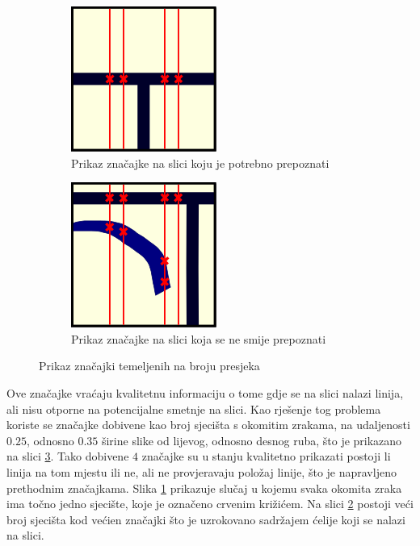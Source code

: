 \documentclass[times, utf8, zavrsni, numeric]{fer}
\begin{document}
\begin{figure}[th!]
    \centering
    \begin{subfigure}{.5\textwidth}
        \centering
        \includegraphics[width=.45\linewidth]{Images/Feature_true_2.png}
        \captionsetup{justification=centering}
        \caption{Prikaz značajke na slici koju je potrebno prepoznati}
        \label{fig:featureDemo2a}
    \end{subfigure}%
    \begin{subfigure}{.5\textwidth}
        \centering
        \includegraphics[width=.45\linewidth]{Images/Feature_false_2.png}
        \caption{Prikaz značajke na slici koja se ne smije prepoznati}
        \label{fig:featureDemo2b}
    \end{subfigure}
    \caption{Prikaz značajki temeljenih na broju presjeka}
    \label{fig:featureDemo2}
\end{figure}

Ove značajke vraćaju kvalitetnu informaciju o tome gdje se na slici nalazi linija, ali nisu otporne na potencijalne smetnje na slici.
Kao rješenje tog problema koriste se značajke dobivene kao broj sjecišta s okomitim zrakama, na udaljenosti $0.25$, odnosno $0.35$ širine slike od lijevog, odnosno desnog ruba, što je prikazano na slici \ref{fig:featureDemo2}.
Tako dobivene $4$ značajke su u stanju kvalitetno prikazati postoji li linija na tom mjestu ili ne, ali ne provjeravaju položaj linije, što je napravljeno prethodnim značajkama.
Slika \ref{fig:featureDemo2a} prikazuje slučaj u kojemu svaka okomita zraka ima točno jedno sjecište, koje je označeno crvenim križićem.
Na slici \ref{fig:featureDemo2b} postoji veći broj sjecišta kod većien značajki što je uzrokovano sadržajem ćelije koji se nalazi na slici.\\
\end{document}
